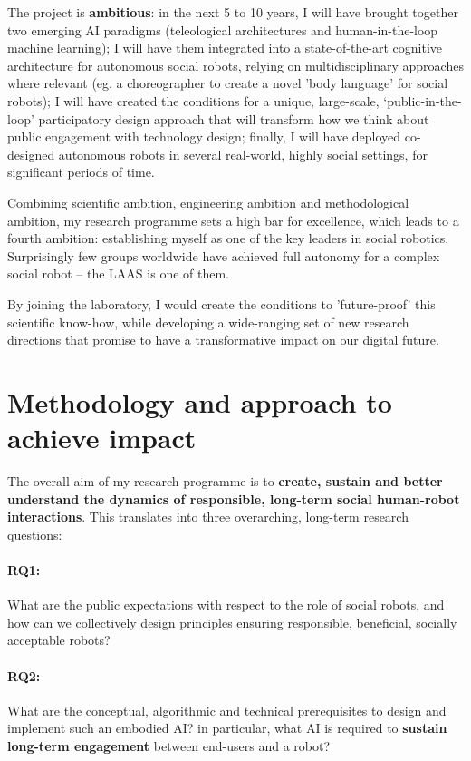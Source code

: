 The project is \textbf{ambitious}: in the next 5 to 10 years, I will have
brought together two emerging AI paradigms (teleological architectures and
human-in-the-loop machine learning); I will have them integrated into a
state-of-the-art cognitive architecture for autonomous social robots, relying on
multidisciplinary approaches where relevant (eg. a choreographer to create a
novel 'body language' for social robots); I will have created the conditions for
a unique, large-scale, `public-in-the-loop' participatory design approach that
will transform how we think about public engagement with technology design;
finally, I will have deployed co-designed autonomous robots in several
real-world, highly social settings, for significant periods of time.

Combining scientific ambition, engineering ambition and methodological ambition,
my research programme sets a high bar for excellence, which leads to a fourth
ambition: establishing myself as one of the key leaders in social robotics.
Surprisingly few groups worldwide have achieved full autonomy for a complex
social robot -- the LAAS is one of them.

By joining the laboratory, I would create the conditions to 'future-proof' this
scientific know-how, while developing a wide-ranging set of new research
directions that promise to have a transformative impact on our digital future.

\newpage
\section{Methodology and approach to achieve impact}

The overall aim of my research programme is to \textbf{create, sustain and better
understand the dynamics of responsible, long-term social human-robot
interactions}. This translates into three overarching, long-term research questions:

\paragraph{\bf RQ1:} What are the public expectations with respect to the role
of social robots, and how can we collectively design principles ensuring
responsible, beneficial, socially acceptable robots?

\paragraph{\bf RQ2:} What are the conceptual, algorithmic and technical
prerequisites to design and implement such an embodied AI? in particular, what
AI is required to \textbf{sustain long-term engagement} between
end-users and a robot?


